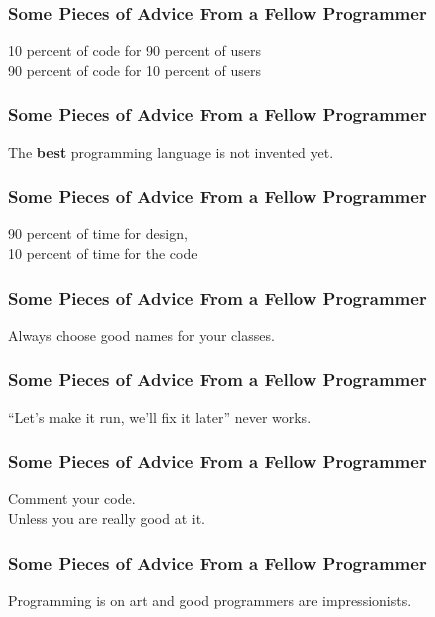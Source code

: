 \documentclass[10pt, compress]{beamer}
\begin{document}
\begin{frame}[fragile]
\frametitle{Some Pieces of Advice From a Fellow Programmer}
  \begin{center}
    10 percent of code for 90 percent of users\\
    90 percent of code for 10 percent of users
  \end{center}
\end{frame}

\begin{frame}[fragile]
\frametitle{Some Pieces of Advice From a Fellow Programmer}
  \begin{center}
    The \textbf{best} programming language is not invented yet.
  \end{center}
\end{frame}

\begin{frame}[fragile]
\frametitle{Some Pieces of Advice From a Fellow Programmer}
  \begin{center}
    90 percent of time for design,\\
    10 percent of time for the code
  \end{center}
\end{frame}

\begin{frame}[fragile]
\frametitle{Some Pieces of Advice From a Fellow Programmer}
  \begin{center}
    Always choose good names for your classes.
  \end{center}
\end{frame}

\begin{frame}[fragile]
\frametitle{Some Pieces of Advice From a Fellow Programmer}
  \begin{center}
    ``Let's make it run, we'll fix it later'' never works.
  \end{center}
\end{frame}

\begin{frame}[fragile]
\frametitle{Some Pieces of Advice From a Fellow Programmer}
  \begin{center}
    Comment your code.\\
    Unless you are really good at it.
  \end{center}
\end{frame}

\begin{frame}[fragile]
\frametitle{Some Pieces of Advice From a Fellow Programmer}
  \begin{center}
    Programming is on art and good programmers are impressionists.
  \end{center}
\end{frame}

\end{document}
